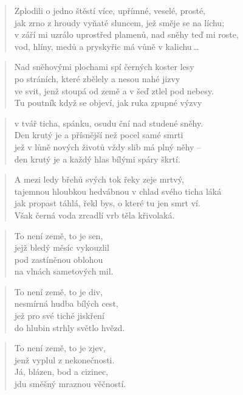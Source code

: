 \documentclass{book}
\begin{document}
\begin{verse}
Zplodili o jedno štěstí více, upřímné, veselé, prosté,\\
jak zrno z hroudy vyňaté sluncem, jež směje se na líchu;\\
v září mi uzrálo uprostřed plamenů, nad sněhy teď mi roste,\\
vod, hlíny, medů a pryskyřic má vůně v kalichu\,\ldots
\end{verse}
\newpage
{}
\begin{verse}
Nad sněhovými plochami spí černých koster lesy\\
po stráních, které zbělely a nesou nahé jizvy\\
ve svit, jenž stoupá od země a v šeď ztlel pod nebesy.\\
Tu poutník když se objeví, jak ruka zpupné výzvy
\end{verse}
\begin{verse}
v tvář ticha, spánku, osudu ční nad studené sněhy.\\
Den krutý je a přísnější než pocel samé smrti\\
jež v lůně nových životů vždy slib má plný něhy --\\
den krutý je a každý hlas bílými spáry škrtí.
\end{verse}
\begin{verse}
A mezi ledy břehů svých tok řeky zeje mrtvý,\\
tajemnou hloubkou hedvábnou v chlad svého ticha láká\\
jak propast táhlá, řekl bys, o které tu jen smrt ví.\\
Však černá voda zrcadlí vrb těla křivolaká.
\end{verse}
\newpage
{}
\begin{verse}
To není země, to je sen,\\
jejž bledý měsíc vykouzlil\\
pod zastíněnou oblohou\\
na vlnách sametových mil.
\end{verse}
\begin{verse}
To není země, to je div,\\
nesmírná hudba bílých cest,\\
jež pro své tiché jiskření\\
do hlubin strhly světlo hvězd.
\end{verse}
\begin{verse}
To není země, to je zjev,\\
jenž vyplul z nekonečnosti.\\
Já, blázen, bod a cizinec,\\
jdu směšný mraznou věčností.
\end{verse}
\end{document}
